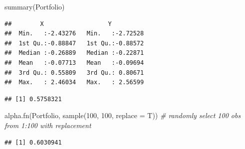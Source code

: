 \documentclass[
]{book}
\newenvironment{Shaded}{\begin{snugshade}}{\end{snugshade}}
\newcommand{\AttributeTok}[1]{\textcolor[rgb]{0.77,0.63,0.00}{#1}}
\newcommand{\CommentTok}[1]{\textcolor[rgb]{0.56,0.35,0.01}{\textit{#1}}}
\newcommand{\ControlFlowTok}[1]{\textcolor[rgb]{0.13,0.29,0.53}{\textbf{#1}}}
\newcommand{\DecValTok}[1]{\textcolor[rgb]{0.00,0.00,0.81}{#1}}
\newcommand{\FunctionTok}[1]{\textcolor[rgb]{0.00,0.00,0.00}{#1}}
\newcommand{\NormalTok}[1]{#1}
\newcommand{\OtherTok}[1]{\textcolor[rgb]{0.56,0.35,0.01}{#1}}
\newcommand{\SpecialCharTok}[1]{\textcolor[rgb]{0.00,0.00,0.00}{#1}}
\begin{document}
\begin{Shaded}
\begin{Highlighting}[]
\FunctionTok{summary}\NormalTok{(Portfolio)}
\end{Highlighting}
\end{Shaded}

\begin{verbatim}
##        X                  Y           
##  Min.   :-2.43276   Min.   :-2.72528  
##  1st Qu.:-0.88847   1st Qu.:-0.88572  
##  Median :-0.26889   Median :-0.22871  
##  Mean   :-0.07713   Mean   :-0.09694  
##  3rd Qu.: 0.55809   3rd Qu.: 0.80671  
##  Max.   : 2.46034   Max.   : 2.56599
\end{verbatim}

\begin{Shaded}
\end{Shaded}

\begin{verbatim}
## [1] 0.5758321
\end{verbatim}

\begin{Shaded}
\begin{Highlighting}[]
\FunctionTok{alpha.fn}\NormalTok{(Portfolio, }\FunctionTok{sample}\NormalTok{(}\DecValTok{100}\NormalTok{, }\DecValTok{100}\NormalTok{, }\AttributeTok{replace =}\NormalTok{ T)) }\CommentTok{\# randomly select 100 obs from 1:100 with replacement}
\end{Highlighting}
\end{Shaded}

\begin{verbatim}
## [1] 0.6030941
\end{verbatim}
\end{document}

